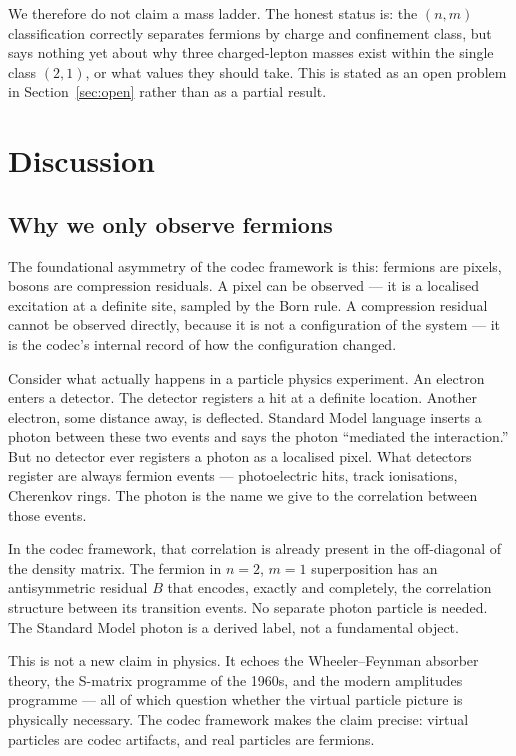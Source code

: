 \documentclass[11pt]{article}
\begin{document}
We therefore do not claim a mass ladder.
The honest status is: the $(n,m)$ classification correctly separates
fermions by charge and confinement class, but says nothing yet about
why three charged-lepton masses exist within the single class
$(2,1)$, or what values they should take.
This is stated as an open problem in Section~\ref{sec:open} rather
than as a partial result.

\section{Discussion}
\label{sec:discussion}

\subsection{Why we only observe fermions}

The foundational asymmetry of the codec framework is this: fermions
are pixels, bosons are compression residuals.
A pixel can be observed --- it is a localised excitation at a
definite site, sampled by the Born rule.
A compression residual cannot be observed directly, because it is
not a configuration of the system --- it is the codec's internal
record of how the configuration changed.

Consider what actually happens in a particle physics experiment.
An electron enters a detector.
The detector registers a hit at a definite location.
Another electron, some distance away, is deflected.
Standard Model language inserts a photon between these two events
and says the photon ``mediated the interaction.''
But no detector ever registers a photon as a localised pixel.
What detectors register are always fermion events --- photoelectric
hits, track ionisations, Cherenkov rings.
The photon is the name we give to the correlation between those
events.

In the codec framework, that correlation is already present in the
off-diagonal of the density matrix.
The fermion in $n{=}2$, $m{=}1$ superposition has an antisymmetric
residual $B$ that encodes, exactly and completely, the correlation
structure between its transition events.
No separate photon particle is needed.
The Standard Model photon is a derived label, not a fundamental
object.

This is not a new claim in physics.
It echoes the Wheeler--Feynman absorber theory, the S-matrix
programme of the 1960s, and the modern amplitudes programme --- all
of which question whether the virtual particle picture is physically
necessary.
The codec framework makes the claim precise: virtual particles are
codec artifacts, and real particles are fermions.
\end{document}
